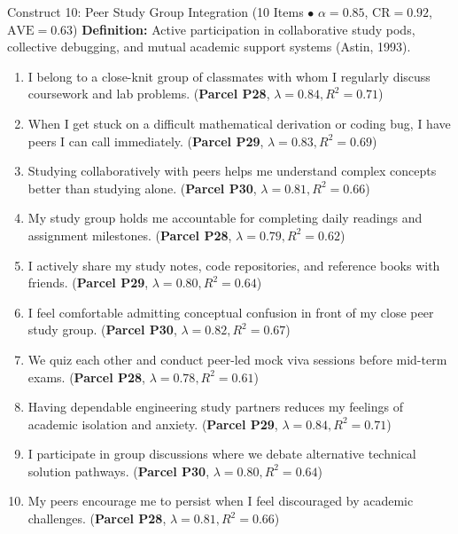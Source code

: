 \documentclass[10pt,a4paper]{article}
\begin{document}
\vspace{0.2cm}
\begin{constructbox}{Construct 10: Peer Study Group Integration (10 Items $\bullet$ $\alpha = 0.85$, $\text{CR} = 0.92$, $\text{AVE} = 0.63$)}
\textbf{Definition:} Active participation in collaborative study pods, collective debugging, and mutual academic support systems (Astin, 1993).
\begin{enumerate}[label=\textbf{Q\arabic*.}, leftmargin=2.5em, itemsep=2pt, resume]
  \item I belong to a close-knit group of classmates with whom I regularly discuss coursework and lab problems. \hfill (\textbf{Parcel P28}, $\lambda = 0.84, R^2 = 0.71$)
  \item When I get stuck on a difficult mathematical derivation or coding bug, I have peers I can call immediately. \hfill (\textbf{Parcel P29}, $\lambda = 0.83, R^2 = 0.69$)
  \item Studying collaboratively with peers helps me understand complex concepts better than studying alone. \hfill (\textbf{Parcel P30}, $\lambda = 0.81, R^2 = 0.66$)
  \item My study group holds me accountable for completing daily readings and assignment milestones. \hfill (\textbf{Parcel P28}, $\lambda = 0.79, R^2 = 0.62$)
  \item I actively share my study notes, code repositories, and reference books with friends. \hfill (\textbf{Parcel P29}, $\lambda = 0.80, R^2 = 0.64$)
  \item I feel comfortable admitting conceptual confusion in front of my close peer study group. \hfill (\textbf{Parcel P30}, $\lambda = 0.82, R^2 = 0.67$)
  \item We quiz each other and conduct peer-led mock viva sessions before mid-term exams. \hfill (\textbf{Parcel P28}, $\lambda = 0.78, R^2 = 0.61$)
  \item Having dependable engineering study partners reduces my feelings of academic isolation and anxiety. \hfill (\textbf{Parcel P29}, $\lambda = 0.84, R^2 = 0.71$)
  \item I participate in group discussions where we debate alternative technical solution pathways. \hfill (\textbf{Parcel P30}, $\lambda = 0.80, R^2 = 0.64$)
  \item My peers encourage me to persist when I feel discouraged by academic challenges. \hfill (\textbf{Parcel P28}, $\lambda = 0.81, R^2 = 0.66$)
\end{enumerate}
\end{constructbox}
\end{document}
